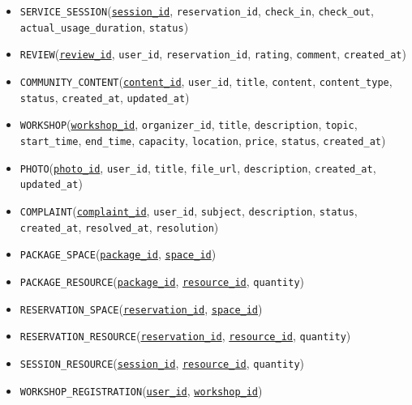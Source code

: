 \begin{itemize}
    \item \texttt{SERVICE\_SESSION}(\underline{\texttt{session\_id}}, \texttt{reservation\_id}, \texttt{check\_in}, \texttt{check\_out}, \texttt{actual\_usage\_duration}, \texttt{status})
    \item \texttt{REVIEW}(\underline{\texttt{review\_id}}, \texttt{user\_id}, \texttt{reservation\_id}, \texttt{rating}, \texttt{comment}, \texttt{created\_at})
    \item \texttt{COMMUNITY\_CONTENT}(\underline{\texttt{content\_id}}, \texttt{user\_id}, \texttt{title}, \texttt{content}, \texttt{content\_type}, \texttt{status}, \texttt{created\_at}, \texttt{updated\_at})
    \item \texttt{WORKSHOP}(\underline{\texttt{workshop\_id}}, \texttt{organizer\_id}, \texttt{title}, \texttt{description}, \texttt{topic}, \texttt{start\_time}, \texttt{end\_time}, \texttt{capacity}, \texttt{location}, \texttt{price}, \texttt{status}, \texttt{created\_at})
    \item \texttt{PHOTO}(\underline{\texttt{photo\_id}}, \texttt{user\_id}, \texttt{title}, \texttt{file\_url}, \texttt{description}, \texttt{created\_at}, \texttt{updated\_at})
    \item \texttt{COMPLAINT}(\underline{\texttt{complaint\_id}}, \texttt{user\_id}, \texttt{subject}, \texttt{description}, \texttt{status}, \texttt{created\_at}, \texttt{resolved\_at}, \texttt{resolution})
    \item \texttt{PACKAGE\_SPACE}(\underline{\texttt{package\_id}}, \underline{\texttt{space\_id}})
    \item \texttt{PACKAGE\_RESOURCE}(\underline{\texttt{package\_id}}, \underline{\texttt{resource\_id}}, \texttt{quantity})
    \item \texttt{RESERVATION\_SPACE}(\underline{\texttt{reservation\_id}}, \underline{\texttt{space\_id}})
    \item \texttt{RESERVATION\_RESOURCE}(\underline{\texttt{reservation\_id}}, \underline{\texttt{resource\_id}}, \texttt{quantity})
    \item \texttt{SESSION\_RESOURCE}(\underline{\texttt{session\_id}}, \underline{\texttt{resource\_id}}, \texttt{quantity})
    \item \texttt{WORKSHOP\_REGISTRATION}(\underline{\texttt{user\_id}}, \underline{\texttt{workshop\_id}})
\end{itemize}

